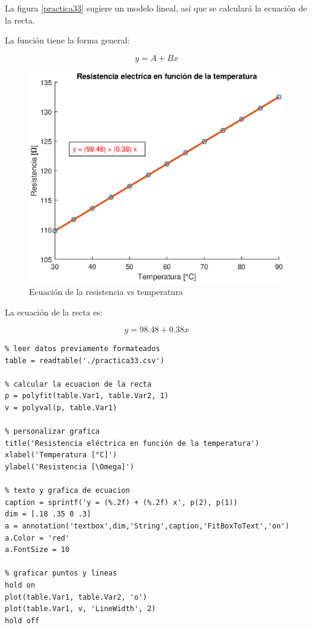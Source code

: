 \documentclass[letter,11pt]{article}
\begin{document}
La figura \ref{practica33} sugiere un modelo lineal, así que se calculará la
ecuación de la recta.

La función tiene la forma general:

\begin{equation}
    y = A + B x
\end{equation}

\begin{figure}[!h]
\centering
\includegraphics[scale=1.00]{eps/practica33_2.eps}
\caption{Ecuación de la resistencia vs temperatura}
\label{practica33_2}
\end{figure}

La ecuación de la recta es:

\begin{equation}
    y = 98.48 + 0.38 x
\end{equation}

\footnotesize
\begin{verbatim}
% leer datos previamente formateados
table = readtable('./practica33.csv')

% calcular la ecuacion de la recta
p = polyfit(table.Var1, table.Var2, 1)
v = polyval(p, table.Var1)

% personalizar grafica
title('Resistencia eléctrica en función de la temperatura')
xlabel('Temperatura [°C]')
ylabel('Resistencia [\Omega]')

% texto y grafica de ecuacion
caption = sprintf('y = (%.2f) + (%.2f) x', p(2), p(1))
dim = [.18 .35 0 .3]
a = annotation('textbox',dim,'String',caption,'FitBoxToText','on')
a.Color = 'red'
a.FontSize = 10

% graficar puntos y lineas
hold on
plot(table.Var1, table.Var2, 'o')
plot(table.Var1, v, 'LineWidth', 2)
hold off
\end{verbatim}
\normalsize
\end{document}
